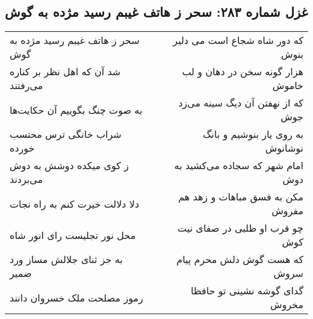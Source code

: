 \begin{center}
\section*{غزل شماره ۲۸۳: سحر ز هاتف غیبم رسید مژده به گوش}
\label{sec:sh283}
\begin{longtable}{l p{0.5cm} r}
سحر ز هاتف غیبم رسید مژده به گوش
&&
که دور شاه شجاع است می دلیر بنوش
\\
شد آن که اهل نظر بر کناره می‌رفتند
&&
هزار گونه سخن در دهان و لب خاموش
\\
به صوت چنگ بگوییم آن حکایت‌ها
&&
که از نهفتن آن دیگ سینه می‌زد جوش
\\
شراب خانگی ترس محتسب خورده
&&
به روی یار بنوشیم و بانگ نوشانوش
\\
ز کوی میکده دوشش به دوش می‌بردند
&&
امام شهر که سجاده می‌کشید به دوش
\\
دلا دلالت خیرت کنم به راه نجات
&&
مکن به فسق مباهات و زهد هم مفروش
\\
محل نور تجلیست رای انور شاه
&&
چو قرب او طلبی در صفای نیت کوش
\\
به جز ثنای جلالش مساز ورد ضمیر
&&
که هست گوش دلش محرم پیام سروش
\\
رموز مصلحت ملک خسروان دانند
&&
گدای گوشه نشینی تو حافظا مخروش
\\
\end{longtable}
\end{center}
